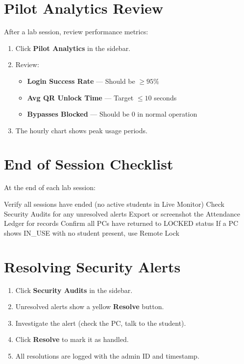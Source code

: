 \section{Pilot Analytics Review}

After a lab session, review performance metrics:

\begin{enumerate}[leftmargin=*, label=\textbf{\arabic*.}]
  \item Click \textbf{Pilot Analytics} in the sidebar.
  \item Review:
    \begin{itemize}[label={--}]
      \item \textbf{Login Success Rate} — Should be $\geq 95\%$
      \item \textbf{Avg QR Unlock Time} — Target $\leq 10$ seconds
      \item \textbf{Bypasses Blocked} — Should be 0 in normal operation
    \end{itemize}
  \item The hourly chart shows peak usage periods.
\end{enumerate}

\section{End of Session Checklist}

At the end of each lab session:

\begin{itemize}[label={\textcolor{aurxongreen}{\faCheckSquare[regular]}}]
  \checkitem Verify all sessions have ended (no active students in Live Monitor)
  \checkitem Check Security Audits for any unresolved alerts
  \checkitem Export or screenshot the Attendance Ledger for records
  \checkitem Confirm all PCs have returned to LOCKED status
  \warnitem If a PC shows IN\_USE with no student present, use Remote Lock
\end{itemize}

\section{Resolving Security Alerts}

\begin{enumerate}[leftmargin=*, label=\textbf{\arabic*.}]
  \item Click \textbf{Security Audits} in the sidebar.
  \item Unresolved alerts show a yellow \textbf{Resolve} button.
  \item Investigate the alert (check the PC, talk to the student).
  \item Click \textbf{Resolve} to mark it as handled.
  \item All resolutions are logged with the admin ID and timestamp.
\end{enumerate}

